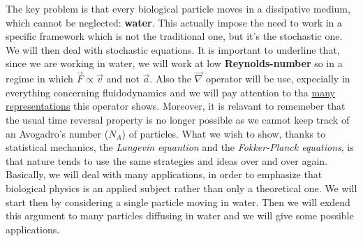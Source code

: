 \documentclass[../main/main.tex]{subfiles}
\begin{document}
The key problem is that every biological particle moves in a dissipative medium, which cannot be neglected: \textbf{water}.
This actually impose the need to work in a specific framework which is not the traditional one, but it's the stochastic one. We will then deal with stochastic equations.
It is important to underline that, since we are working in water, we will work at low \textbf{Reynolds-number} so in a regime in which $\vec{F}\propto \vec{v}$ and not $\vec{a}$. Also the $\vec{\nabla}$ operator will be use, expecially in everything concerning fluidodynamics and we will pay attention to tha \href{https://en.wikipedia.org/wiki/Del_in_cylindrical_and_spherical_coordinates#Del_formula}{many representations} this operator shows.
Moreover, it is relavant to rememeber that the usual time reversal property is no longer possible as we cannot keep track of an Avogadro's number ($N_A$) of particles. 
What we wish to show, thanks to statistical mechanics, the \emph{Langevin equantion} and the \emph{Fokker-Planck equations}, is that nature tends to use the same strategies and ideas over and over again. Basically, we will deal with many applications, in order to emphasize that biological physics is an applied subject rather than only a theoretical one. 
We will start then by considering a single particle moving in water. Then we will exdend this argument to many particles diffusing in water and we will give some possible applications.
\end{document}
